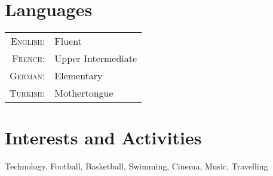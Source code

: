 \documentclass[a4paper,10pt]{article} %
\begin{document}

\section{Languages}

\begin{tabular}{r|p{13cm}}
\textsc{English:} & Fluent\\

\textsc{French:} & Upper Intermediate\\

\textsc{German:} & Elementary\\

\textsc{Turkish:} & Mothertongue\\
\end{tabular}



\section{Interests and Activities}

Technology, Football, Basketball, Swimming, Cinema, Music, Travelling\\
\end{document}
